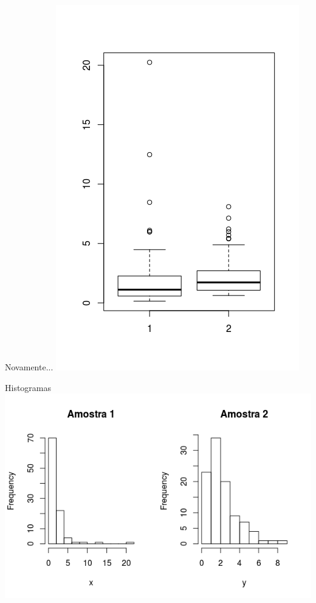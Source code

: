 \documentclass{beamer}
\begin{document}
\begin{frame}{Novamente...}
  \centering
  \includegraphics[height=\textheight]{Nao_Param/2samples-bp}
\end{frame}

\begin{frame}{Histogramas}
  \includegraphics[width=\textwidth]{Nao_Param/2samples-h}

\end{frame}
\end{document}
